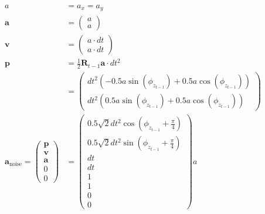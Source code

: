 \documentclass{article}
\begin{document}
\begin{align}
  a &= a_x = a_y \\
  \textbf{a} &= \left(\begin{matrix}a\\a\end{matrix}\right) \\
  \textbf{v} &= \left(\begin{matrix}a \cdot dt\\a \cdot dt\end{matrix}\right) \\
  \textbf{p} &= \frac{1}{2}\textbf{R}_{t-1}\textbf{a} \cdot dt^2 \\ 
  &= \left(\begin{matrix}dt^{2} \left(- 0.5 a \sin{\left(\phi_{z_{t-1}} \right)} + 0.5 a \cos{\left(\phi_{z_{t-1}} \right)}\right)\\dt^{2} \left(0.5 a \sin{\left(\phi_{z_{t-1}} \right)} + 0.5 a \cos{\left(\phi_{z_{t-1}} \right)}\right)\end{matrix}\right) \\
  \textbf{a}_{\textrm{noise}} =
  \left(\begin{matrix}
    \textbf{p} \\
    \textbf{v} \\
    \textbf{a} \\
    0 \\
    0
  \end{matrix}\right)
&=\left(\begin{matrix}0.5 \sqrt{2} dt^{2} \cos{\left(\phi_{z_{t-1}} + \frac{\pi}{4} \right)}\\0.5 \sqrt{2} dt^{2} \sin{\left(\phi_{z_{t-1}} + \frac{\pi}{4} \right)}\\dt\\dt\\1\\1\\0\\0\end{matrix}\right) a
\end{align}
\end{document}
